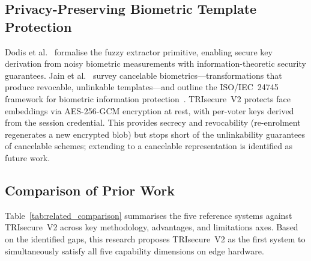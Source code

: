 \documentclass[pdflatex,sn-mathphys-num]{sn-jnl}%
\theoremstyle{thmstyleone}%
\theoremstyle{thmstyletwo}%
\theoremstyle{thmstylethree}%
\begin{document}
\subsection{Privacy-Preserving Biometric Template Protection}

Dodis et al.~\cite{dodis2004fuzzy} formalise the fuzzy extractor primitive,
enabling secure key derivation from noisy biometric measurements with
information-theoretic security guarantees. Jain et al.~\cite{jain2008cancelable}
survey cancelable biometrics—transformations that produce revocable, unlinkable
templates—and outline the ISO/IEC~24745 framework for biometric information
protection~\cite{iso24745}. TRIsecure~V2 protects face embeddings via
AES-256-GCM encryption at rest, with per-voter keys derived from the session
credential. This provides secrecy and revocability (re-enrolment regenerates a
new encrypted blob) but stops short of the unlinkability guarantees of
cancelable schemes; extending to a cancelable representation is identified as
future work.

\subsection{Comparison of Prior Work}\label{sec:related_comparison}

Table~\ref{tab:related_comparison} summarises the five reference systems against
TRIsecure~V2 across key methodology, advantages, and limitations axes. Based on
the identified gaps, this research proposes TRIsecure~V2 as the first system to
simultaneously satisfy all five capability dimensions on edge hardware.
\end{document}
